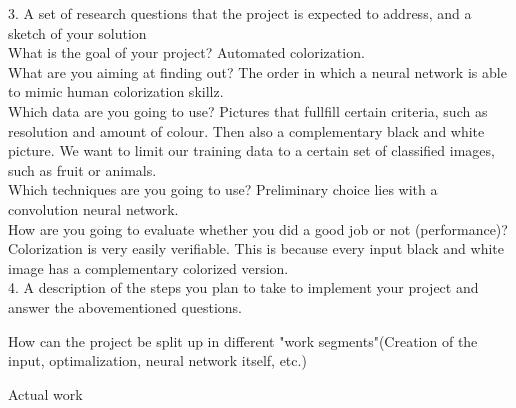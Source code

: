 3. A set of research questions that the project is expected to address, and a sketch of your solution\\
What is the goal of your project? Automated colorization.\\
What are you aiming at finding out? The order in which a neural network is able to mimic human colorization skillz. \\
Which data are you going to use? Pictures that fullfill certain criteria, such as resolution and amount of colour. Then also a complementary black and white picture.
We want to limit our training data to a certain set of classified images, such as fruit or animals.\\
Which techniques are you going to use? Preliminary choice lies with a convolution neural network.\\
How are you going to evaluate whether you did a good job or not (performance)? Colorization is very easily verifiable. This is because every input black and white image has a complementary colorized version.\\
4. A description of the steps you plan to take to implement your project and answer the abovementioned questions. \\
\item How can the project be split up in different "work segments"(Creation of the input, optimalization, neural network itself, etc.)
\item Actual work
